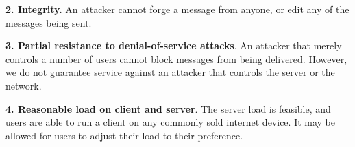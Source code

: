 \textbf{2. Integrity.} An attacker cannot forge a message from anyone, or edit any of the messages being sent.

\textbf{3. Partial resistance to denial-of-service attacks}. An attacker that merely controls a number of users cannot block messages from being delivered. However, we do not guarantee service against an attacker that controls the server or the network.

\textbf{4. Reasonable load on client and server}. The server load is feasible, and users are able to run a client on any commonly sold internet device. It may be allowed for users to adjust their load to their preference.

